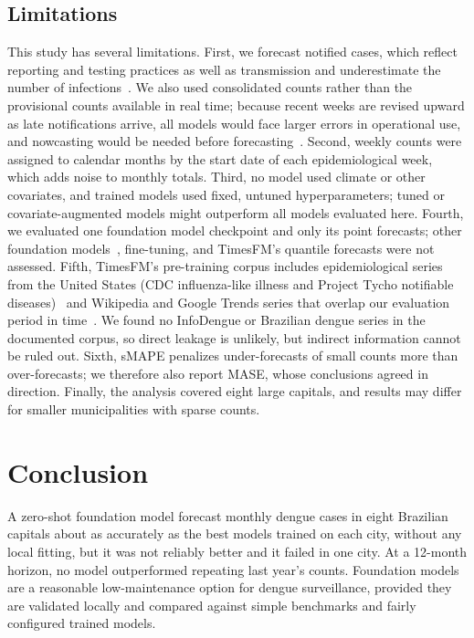 \documentclass[10pt,letterpaper]{article}
\begin{document}
\subsection*{Limitations}
This study has several limitations. First, we forecast notified cases, which reflect reporting and testing practices as well as transmission and underestimate the number of infections~\cite{Bhatt2013}. We also used consolidated counts rather than the provisional counts available in real time; because recent weeks are revised upward as late notifications arrive, all models would face larger errors in operational use, and nowcasting would be needed before forecasting~\cite{Codeco2018infodengue}. Second, weekly counts were assigned to calendar months by the start date of each epidemiological week, which adds noise to monthly totals. Third, no model used climate or other covariates, and trained models used fixed, untuned hyperparameters; tuned or covariate-augmented models might outperform all models evaluated here. Fourth, we evaluated one foundation model checkpoint and only its point forecasts; other foundation models~\cite{Ansari2024chronos,Woo2024moirai}, fine-tuning, and TimesFM's quantile forecasts were not assessed. Fifth, TimesFM's pre-training corpus includes epidemiological series from the United States (CDC influenza-like illness and Project Tycho notifiable diseases)~\cite{Aksu2024gifteval} and Wikipedia and Google Trends series that overlap our evaluation period in time~\cite{TimesFM25card}. We found no InfoDengue or Brazilian dengue series in the documented corpus, so direct leakage is unlikely, but indirect information cannot be ruled out. Sixth, sMAPE penalizes under-forecasts of small counts more than over-forecasts; we therefore also report MASE, whose conclusions agreed in direction. Finally, the analysis covered eight large capitals, and results may differ for smaller municipalities with sparse counts.

\section*{Conclusion}
A zero-shot foundation model forecast monthly dengue cases in eight Brazilian capitals about as accurately as the best models trained on each city, without any local fitting, but it was not reliably better and it failed in one city. At a 12-month horizon, no model outperformed repeating last year's counts. Foundation models are a reasonable low-maintenance option for dengue surveillance, provided they are validated locally and compared against simple benchmarks and fairly configured trained models.
\end{document}
